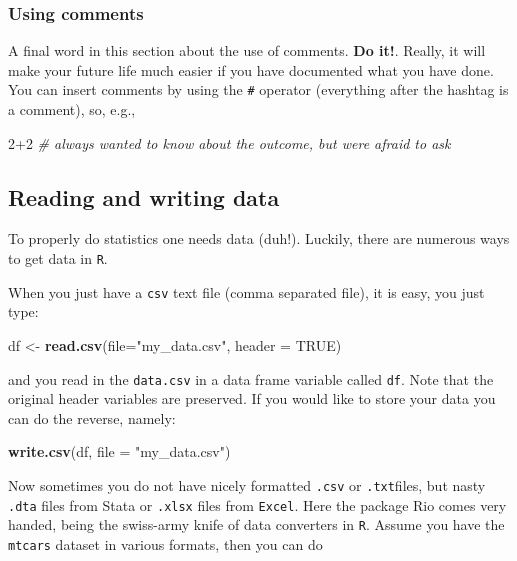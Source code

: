 \documentclass[]{article}
\newenvironment{Shaded}{\begin{snugshade}}{\end{snugshade}}
\newcommand{\KeywordTok}[1]{\textcolor[rgb]{0.13,0.29,0.53}{\textbf{{#1}}}}
\newcommand{\DataTypeTok}[1]{\textcolor[rgb]{0.13,0.29,0.53}{{#1}}}
\newcommand{\DecValTok}[1]{\textcolor[rgb]{0.00,0.00,0.81}{{#1}}}
\newcommand{\StringTok}[1]{\textcolor[rgb]{0.31,0.60,0.02}{{#1}}}
\newcommand{\CommentTok}[1]{\textcolor[rgb]{0.56,0.35,0.01}{\textit{{#1}}}}
\newcommand{\OtherTok}[1]{\textcolor[rgb]{0.56,0.35,0.01}{{#1}}}
\newcommand{\NormalTok}[1]{{#1}}
\theoremstyle{definition}
\theoremstyle{definition}
\theoremstyle{definition}
\theoremstyle{remark}
\begin{document}
\subsubsection{Using comments}\label{using-comments}

A final word in this section about the use of comments. \textbf{Do it!}.
Really, it will make your future life much easier if you have documented
what you have done. You can insert comments by using the \texttt{\#}
operator (everything after the hashtag is a comment), so, e.g.,

\begin{Shaded}
\begin{Highlighting}[]
\DecValTok{2+2} \CommentTok{# always wanted to know about the outcome, but were afraid to ask}
\end{Highlighting}
\end{Shaded}

\subsection{Reading and writing data}\label{reading-and-writing-data}

To properly do statistics one needs data (duh!). Luckily, there are
numerous ways to get data in \texttt{R}.

When you just have a \texttt{csv} text file (comma separated file), it
is easy, you just type:

\begin{Shaded}
\begin{Highlighting}[]
\NormalTok{df <-}\StringTok{ }\KeywordTok{read.csv}\NormalTok{(}\DataTypeTok{file=}\StringTok{"my_data.csv"}\NormalTok{, }\DataTypeTok{header =} \OtherTok{TRUE}\NormalTok{)}
\end{Highlighting}
\end{Shaded}

and you read in the \texttt{data.csv} in a data frame variable called
\texttt{df}. Note that the original header variables are preserved. If
you would like to store your data you can do the reverse, namely:

\begin{Shaded}
\begin{Highlighting}[]
\KeywordTok{write.csv}\NormalTok{(df, }\DataTypeTok{file =} \StringTok{"my_data.csv"}\NormalTok{)}
\end{Highlighting}
\end{Shaded}

Now sometimes you do not have nicely formatted \texttt{.csv} or
\texttt{.txt}files, but nasty \texttt{.dta} files from Stata or
\texttt{.xlsx} files from \texttt{Excel}. Here the package Rio comes
very handed, being the swiss-army knife of data converters in
\texttt{R}. Assume you have the \texttt{mtcars} dataset in various
formats, then you can do
\end{document}
